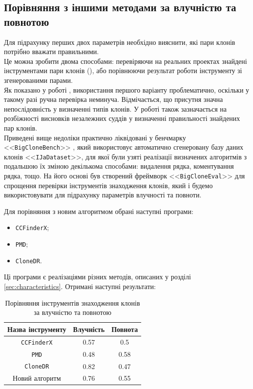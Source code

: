 \documentclass[a4paper, 14pt]{article}
\begin{document}
\subsection{Порівняння з іншими методами за влучністю та повнотою}
\par Для підрахунку перших двох параметрів необхідно вияснити, які пари клонів потрібно вважати правильними. \\ 
Це можна зробити двома способами: перевіряючи на реальних проектах знайдені інструментами пари клонів (\cite{Bellon07}), або порівнюючи результат роботи інструменту зі згенерованими парами. \\ 
Як показано у роботі \cite{Roy18}, використання першого варіанту проблематично, оскільки у такому разі ручна перевірка неминуча. Відмічається, що присутня значна непослідовність у визначенні типів клонів. У роботі \cite{Charpentier15} також зазначається на розбіжності висновків незалежних суддів у визначенні правильності знайдених пар клонів. \\
Приведені вище недоліки практично ліквідовані у бенчмарку <<\verb|BigCloneBench|>> \cite{Svajlenko14}, який використовує автоматично сгенеровану базу даних клонів <<\verb|IJaDataset|>>, для якої були узяті реалізації визначених алгоритмів з подальшою їх зміною декількома способами: видалення рядка, коментування рядка, тощо. На його основі був створений фреймворк <<\verb|BigCloneEval|>> для спрощення перевірки інструментів знаходження клонів, який і будемо використовувати для підрахунку параметрів влучності та повноти. \par
Для порівняння з новим алгоритмом обрані наступні програми:
\begin{itemize}
\item \verb|CCFinderX|;
\item \verb|PMD|;
\item \verb|CloneDR|.
\end{itemize}
Ці програми є реалізаціями різних методів, описаних у розділі \ref{sec:characteristics}.
Отримані наступні результати: \\
\begin{table}[ht]
\centering
\caption{\centering Порівняння інструментів знаходження клонів за влучністю та повнотою}
 \begin{tabular}{| c | c | c |} 
 \hline
 Назва інструменту & Влучність & Повнота \\ [0.5ex] 
 \hline
 \verb|CCFinderX| & 0.57 & 0.5 \\ 
 \hline
 \verb|PMD| & 0.48 & 0.58 \\
 \hline
 \verb|CloneDR| & 0.82 & 0.47 \\
 \hline
 Новий алгоритм & 0.76 & 0.55 \\ [1ex]
 \hline
\end{tabular} 
\end{table} \\
\end{document}
